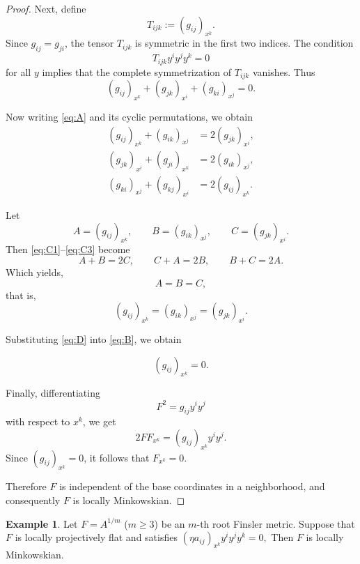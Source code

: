 \documentclass[12pt]{article}
\theoremstyle{definition}
\newtheorem{example}[theorem]{Example}
\begin{document}
\begin{proof}
									Next, define
									\[
									T_{ijk}:=(g_{ij})_{x^k}.
									\]
									Since $g_{ij}=g_{ji}$, the tensor $T_{ijk}$ is symmetric in the first two indices. The condition
									\[
									T_{ijk}y^iy^jy^k=0
									\]
									for all $y$ implies that the complete symmetrization of $T_{ijk}$ vanishes. Thus
									\begin{equation}
									(g_{ij})_{x^k}
									+
									(g_{jk})_{x^i}
									+
									(g_{ki})_{x^j}
									=
									0.
									\label{eq:B}
									\end{equation}
									
									Now writing \eqref{eq:A} and its cyclic permutations, we obtain
									\begin{align}
										(g_{ij})_{x^k}
										+
										(g_{ik})_{x^j}
										&=
										2(g_{jk})_{x^i},
										\label{eq:C1}
										\\
										(g_{jk})_{x^i}
										+
										(g_{ji})_{x^k}
										&=
										2(g_{ik})_{x^j},
										\label{eq:C2}
										\\
										(g_{ki})_{x^j}
										+
										(g_{kj})_{x^i}
										&=
										2(g_{ij})_{x^k}.
										\label{eq:C3}
									\end{align}
									
									Let
									\[
									A=(g_{ij})_{x^k},
									\qquad
									B=(g_{ik})_{x^j},
									\qquad
									C=(g_{jk})_{x^i}.
									\]
									Then \eqref{eq:C1}--\eqref{eq:C3} become
									\[
									A+B=2C,
									\qquad
									C+A=2B,
									\qquad
									B+C=2A.
									\]
									Which yields,
									\[
									A=B=C,
									\]
									that is,
									\begin{equation}
									(g_{ij})_{x^k}
									=
									(g_{ik})_{x^j}
									=
									(g_{jk})_{x^i}.
									\label{eq:D}
									\end{equation}
									
									Substituting \eqref{eq:D} into \eqref{eq:B}, we obtain
									
									\[
									(g_{ij})_{x^k}=0.
									\]
									
									Finally, differentiating
									\[
									F^2=g_{ij}y^iy^j
									\]
									with respect to $x^k$, we get
									\[
									2FF_{x^k}
									=
									(g_{ij})_{x^k}y^iy^j.
									\]
									Since $(g_{ij})_{x^k}=0$, it follows that $F_{x^k}=0.$
									
									Therefore $F$ is independent of the base coordinates in a neighborhood, and consequently $F$ is locally Minkowskian.
								\end{proof}
								\begin{example}
									\textnormal{
										Let \(F=A^{1/m}\) (\(m\ge3\)) be an \(m\)-th root Finsler metric.
										Suppose that \(F\) is locally projectively flat and satisfies $(\eta a_{ij})_{x^k}y^iy^jy^k=0,$ Then \(F\) is locally Minkowskian.}    
									\end{example}
									
\end{document}
